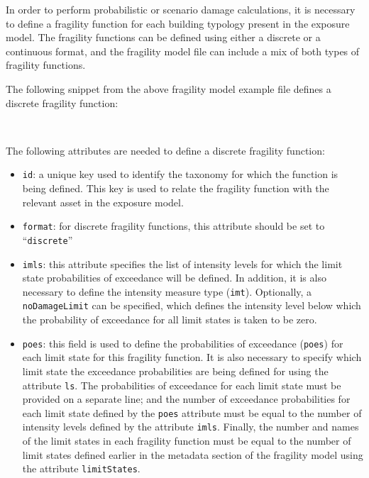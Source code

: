 In order to perform probabilistic or scenario damage calculations, it is
necessary to define a \gls{fragility function} for each building typology present in
the exposure model. The \glspl{fragility function} can be defined using either a
discrete or a continuous format, and the \gls{fragility model} file can include a
mix of both types of \glspl{fragility function}.

The following snippet from the above fragility model example file defines a
discrete fragility function:

\inputminted[firstline=11,firstnumber=11,lastline=17,fontsize=\footnotesize,frame=single,linenos,bgcolor=lightgray]{xml}{oqum/risk/Verbatim/input_fragility.xml}\\

The following attributes are needed to define a discrete \gls{fragility function}:

\begin{itemize}

    \item \Verb+id+: a unique key used to identify the \gls{taxonomy} for 
    which the function is being defined. This key is used to relate the 
    \gls{fragility function} with the relevant \gls{asset} in the 
    \gls{exposure model}.

    \item \Verb+format+: for discrete fragility functions, this attribute 
    should be set to ``\Verb+discrete+''

    \item \Verb+imls+: this attribute specifies the list of intensity levels
    for which the limit state probabilities of exceedance will be defined. 
    In addition, it is also necessary to define the intensity measure type 
    (\Verb+imt+). Optionally, a \Verb+noDamageLimit+ can be specified, which 
    defines the intensity level below which the probability of exceedance 
    for all limit states is taken to be zero.

    \item \Verb+poes+: this field is used to define the probabilities of 
    exceedance (\Verb+poes+) for each limit state for this 
    \gls{fragility function}. It is also necessary to specify which limit 
    state the exceedance probabilities are being defined for using the 
    attribute \Verb+ls+. The probabilities of exceedance for each limit state
    must be provided on a separate line; and the number of exceedance 
    probabilities for each limit state defined by the \Verb+poes+ attribute 
    must be equal to the number of intensity levels defined by the attribute 
    \Verb+imls+. Finally, the number and names of the limit states in each 
    fragility function must be equal to the number of limit states defined 
    earlier in the metadata section of the \gls{fragility model} using the 
    attribute \Verb+limitStates+.

\end{itemize}




